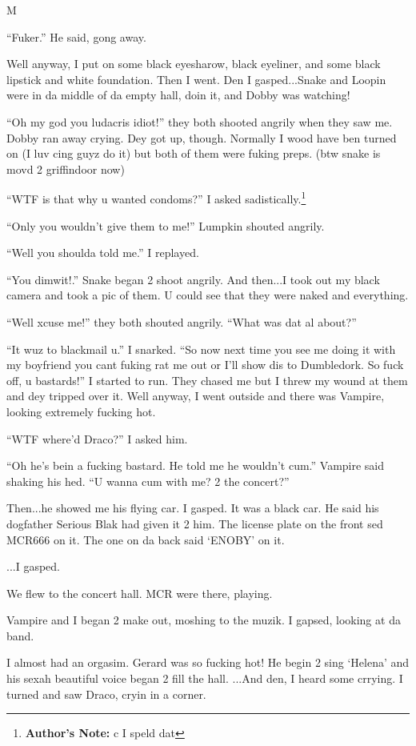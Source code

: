 M\documentclass{article}
\begin{document}
“Fuker.” He said, gong away.

Well anyway, I put on some black eyesharow, black eyeliner, and some black lipstick and white foundation. Then I went. Den I gasped...Snake and Loopin were in da middle of da empty hall, doin it, and Dobby was watching!

“Oh my god you ludacris idiot!” they both shooted angrily when they saw me. Dobby ran away crying. Dey got up, though. Normally I wood have ben turned on (I luv cing guyz do it) but both of them were fuking preps. (btw snake is movd 2 griffindoor now)

“WTF is that why u wanted condoms?” I asked sadistically.\footnote{\textbf{Author's Note: }c I speld dat}

“Only you wouldn’t give them to me!” Lumpkin shouted angrily.

“Well you shoulda told me.” I replayed.

“You dimwit!.” Snake began 2 shoot angrily. And then...I took out my black camera and took a pic of them. U could see that they were naked and everything.

“Well xcuse me!” they both shouted angrily. “What was dat al about?”

“It wuz to blackmail u.” I snarked. “So now next time you see me doing it with my boyfriend you cant fuking rat me out or I’ll show dis to Dumbledork. So fuck off, u bastards!” I started to run. They chased me but I threw my wound at them and dey tripped over it. Well anyway, I went outside and there was Vampire, looking extremely fucking hot.

“WTF where’d Draco?” I asked him.

“Oh he’s bein a fucking bastard. He told me he wouldn’t cum.” Vampire said shaking his hed. “U wanna cum with me? 2 the concert?”

Then...he showed me his flying car. I gasped. It was a black car. He said his dogfather Serious Blak had given it 2 him. The license plate on the front sed MCR666 on it. The one on da back said ‘ENOBY’ on it.

...I gasped.

We flew to the concert hall. MCR were there, playing.

Vampire and I began 2 make out, moshing to the muzik. I gapsed, looking at da band.

I almost had an orgasim. Gerard was so fucking hot! He begin 2 sing ‘Helena’ and his sexah beautiful voice began 2 fill the hall. ...And den, I heard some crrying. I turned and saw Draco, cryin in a corner.
\end{document}
